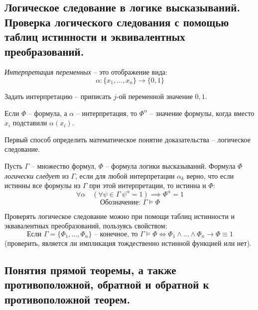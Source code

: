 \subsection{Логическое следование в логике высказываний. Проверка логического следования с помощью таблиц истинности и эквивалентных преобразований.}

\begin{definition}
    \emph{Интерпретация переменных} -- это отображение вида:
    \[
        \alpha: \{x_1,\ldots,x_n\}\rightarrow \{0,1\}
    \]

    Задать интерпретацию -- приписать $j$-ой переменной значение $0,1$.
\end{definition}

\begin{note}
    Если $\Phi$ -- формула, а $\alpha$ -- интерпретация, то $\Phi^\alpha$ -- значение формулы, когда вместо $x_i$ подставили $\alpha(x_i)$.

    Первый способ определить математическое понятие доказательства -- логическое следование.
\end{note}

\begin{definition}
    Пусть $\Gamma$ -- множество формул, $\Phi$ -- формула логики высказываний. Формула $\Phi$ \emph{логически следует} из $\Gamma$, если для любой интерпретации $\alpha_k$ верно, что если истинны все формулы из $\Gamma$ при этой интерпретации, то истинна и $\Phi$:
    \[
        \forall \alpha \quad (\forall \psi \in \Gamma \ \psi^\alpha = 1) \implies \Phi^\alpha = 1
    \]
    \[
        \text{Обозначение: }\Gamma \vDash \Phi
    \]
\end{definition}

\begin{remark}
    Проверять логическое следование можно при помощи таблиц истинности и эквавалентных преобразований, пользуясь свойством:
    \[
        \text{Если }\Gamma = \{\Phi_1,\ldots,\Phi_n\}\text{ -- конечное, то }\Gamma \vDash\Phi \iff \Phi_1\land\ldots\land\Phi_n \rightarrow \Phi\equiv 1
    \]
    (проверить, является ли импликация тождественно истинной функцией или нет).
\end{remark}

\subsection{Понятия прямой теоремы, а также противоположной, обратной и обратной к противоположной теорем.}

